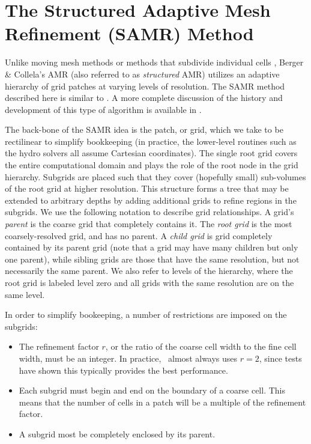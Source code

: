 \section{The Structured Adaptive Mesh Refinement (SAMR) Method}
\label{sec.amr}


Unlike moving mesh methods \citep{1995ApJS..100..269P,1995ApJS...97..231G} or  methods that subdivide individual cells \citep{Adjerid}, Berger \& Collela's AMR (also referred to as \emph{structured} AMR) utilizes an adaptive hierarchy of grid patches at varying levels of resolution.  The SAMR method described here is similar to \citet{Berger89}.  A more complete discussion of the history and development of this type of algorithm is available in \citet{Neeman96}.

The back-bone of the SAMR idea is the patch, or grid, which we take to be rectilinear to simplify bookkeeping (in practice, the lower-level routines such as the hydro solvers all assume Cartesian coordinates).  The single root grid covers the entire computational domain and plays the role of the root node in the grid hierarchy.  Subgrids are placed such that they cover (hopefully small) sub-volumes of the root grid at higher resolution.  This structure forms a tree that may be extended to arbitrary depths by adding additional grids to refine regions in the subgrids.  We use the following notation to describe grid relationships.  A grid's \textit{parent} is the coarse grid that completely contains it.  The \textit{root grid} is the most coarsely-resolved grid, and has no parent.  A \textit{child grid} is grid completely contained by its parent grid (note that a grid may have many children but only one parent), while sibling grids are those that have the same resolution, but not necessarily the same parent.  We also refer to levels of the hierarchy, where the root grid is labeled level zero and all grids with the same resolution are on the
same level.

In order to simplify bookeeping, a number of restrictions are imposed on the subgrids:
\begin{itemize}
 \item The refinement factor $r$, or the ratio of the coarse cell width to the fine cell width, must be an integer.  In practice, \enzo\ almost always uses $r=2$, since tests have shown this typically provides the best performance.
 \item Each subgrid must begin and end on the boundary of a coarse cell.  This means that the number of cells in a patch will be a multiple of the refinement factor.
 \item A subgrid most be completely enclosed by its parent.
\end{itemize}

